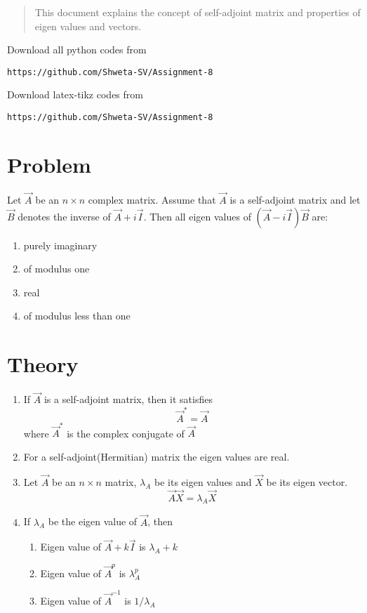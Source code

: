 \documentclass[journal,12pt,twocolumn]{IEEEtran}
\begin{document}
%
\vspace{2ex}
\begin{center}
\end{center}
\begin{abstract}
This document explains the concept of self-adjoint matrix and properties of eigen values and vectors.
\end{abstract}
Download all python codes from 
%
\begin{lstlisting}
https://github.com/Shweta-SV/Assignment-8
\end{lstlisting}
%
Download latex-tikz codes from 
%
\begin{lstlisting}
https://github.com/Shweta-SV/Assignment-8
\end{lstlisting}
%
\section{Problem}
Let $\vec{A}$ be an $n \times n$ complex matrix. Assume that $\vec{A}$ is a self-adjoint matrix and let $\vec{B}$ denotes the inverse of $\vec{A}+i\vec{I}$. Then all eigen values of $(\vec{A}-i\vec{I})\vec{B}$ are:
\begin{enumerate}
\item purely imaginary 
\item of modulus one 
\item real 
\item of modulus less than one
\end{enumerate}
\section{Theory}
\begin{enumerate}
\item If $\vec{A}$ is a self-adjoint matrix, then it satisfies 
\begin{equation}\label{2.0.1}
\vec{A}^{*} = \vec{A}
\end{equation}
where $\vec{A}^{*}$ is the complex conjugate of $\vec{A}$
\item For a self-adjoint(Hermitian) matrix the eigen values are real.
\item Let $\vec{A}$ be an $n \times n$ matrix, $\lambda_A$ be its eigen values and $\vec{X}$ be its eigen vector.
\begin{equation}\label{2.0.2}
\vec{A}\vec{X} = \lambda_A \vec{X} 
\end{equation}
\item If $\lambda_A$ be the eigen value of $\vec{A}$, then 
\begin{enumerate}
 \item Eigen value of $\vec{A}+k\vec{I}$ is $\lambda_A+k$
 \item Eigen value of $\vec{A}^p$ is $\lambda_A^p$
 \item Eigen value of $\vec{A}^{-1}$ is $1/\lambda_A$
\end{enumerate}
\end{enumerate}
\end{document}
